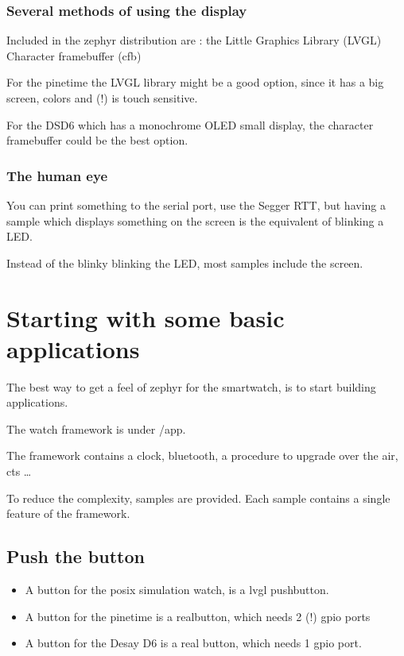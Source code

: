 \documentclass[letterpaper,10pt,english]{sphinxmanual}
\begin{document}
\subsection{Several methods of using the display}
\label{\detokenize{display:several-methods-of-using-the-display}}
Included in the zephyr distribution are :
\sphinxhyphen{} the Little Graphics Library  (LVGL)
\sphinxhyphen{} Character framebuffer (cfb)

For the pinetime the LVGL library might be a good option, since it has a big screen, colors and (!) is touch sensitive.

For the DS\sphinxhyphen{}D6 which has a monochrome OLED small display, the character framebuffer could be the best option.


\subsection{The human eye}
\label{\detokenize{display:the-human-eye}}
You can print something to the serial port, use the Segger RTT, but having a sample which displays something on the screen is the equivalent of blinking a LED.

Instead of the blinky blinking the LED, most samples include the screen.


\chapter{Starting with some basic applications}
\label{\detokenize{basicapplications:starting-with-some-basic-applications}}\label{\detokenize{basicapplications::doc}}
The best way to get a feel of zephyr for the smartwatch, is to start building applications.

The watch framework is under /app.

The framework contains a clock, bluetooth, a procedure to upgrade over the air, cts  …

To reduce the complexity, samples are provided.
Each sample contains a single feature of the framework.


\section{Push the button}
\label{\detokenize{basicapplications:push-the-button}}\begin{itemize}
\item {} 
A button for the posix simulation watch, is a lvgl pushbutton.

\item {} 
A button for the pinetime is a realbutton, which needs 2 (!) gpio ports

\item {} 
A button for the Desay D6 is a real button, which needs 1 gpio port.

\end{itemize}
\end{document}
